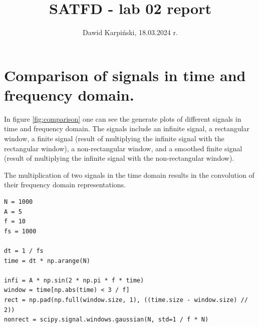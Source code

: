 \documentclass[13pt,a4paper]{article}
\begin{document}
\title{
    \LARGE
    \textbf{SATFD - lab 02 report}
}
\author{
    \large
    Dawid Karpiński, 18.03.2024 r.
}
\date{}
\maketitle

\section{Comparison of signals in time and frequency domain.}

In figure \ref{fig:comparison} one can see the generate plots of different signals in time and frequency domain. The signals include an infinite signal, a rectangular window, a finite signal (result of multiplying the infinite signal with the rectangular window), a non-rectangular window, and a smoothed finite signal (result of multiplying the infinite signal with the non-rectangular window).

The multiplication of two signals in the time domain results in the convolution of their frequency domain representations.

\begin{lstlisting}[caption={\textbf{Code snippet for generating the signals.}}]
N = 1000
A = 5
f = 10
fs = 1000

dt = 1 / fs
time = dt * np.arange(N)

infi = A * np.sin(2 * np.pi * f * time)
window = time[np.abs(time) < 3 / f]
rect = np.pad(np.full(window.size, 1), ((time.size - window.size) // 2))
nonrect = scipy.signal.windows.gaussian(N, std=1 / f * N)
\end{lstlisting}
\end{document}
